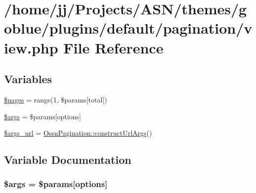 \hypertarget{themes_2goblue_2plugins_2default_2pagination_2view_8php}{}\section{/home/jj/\+Projects/\+A\+S\+N/themes/goblue/plugins/default/pagination/view.php File Reference}
\label{themes_2goblue_2plugins_2default_2pagination_2view_8php}
\subsection*{Variables}
\begin{DoxyCompactItemize}
\item 
\hyperlink{themes_2goblue_2plugins_2default_2pagination_2view_8php_a263621399c53f2952c2329ee13ad8e4e}{\$pages} = range(1, \$params\mbox{[}\textquotesingle{}total\textquotesingle{}\mbox{]})
\item 
\hyperlink{themes_2goblue_2plugins_2default_2pagination_2view_8php_a67e94494731d99ed23b123e95175bc10}{\$args} = \$params\mbox{[}\textquotesingle{}options\textquotesingle{}\mbox{]}
\item 
\hyperlink{themes_2goblue_2plugins_2default_2pagination_2view_8php_aa1f410f2935a06fa254645d417732114}{\$args\+\_\+url} = \hyperlink{class_ossn_pagination_a198554f7cf10c527e6f3a815796829f1}{Ossn\+Pagination\+::construct\+Url\+Args}()
\end{DoxyCompactItemize}


\subsection{Variable Documentation}
\subsubsection[{\texorpdfstring{\$args}{$args}}]{\setlength{\rightskip}{0pt plus 5cm}\$args = \$params\mbox{[}\textquotesingle{}options\textquotesingle{}\mbox{]}}\hypertarget{themes_2goblue_2plugins_2default_2pagination_2view_8php_a67e94494731d99ed23b123e95175bc10}{}\label{themes_2goblue_2plugins_2default_2pagination_2view_8php_a67e94494731d99ed23b123e95175bc10}


